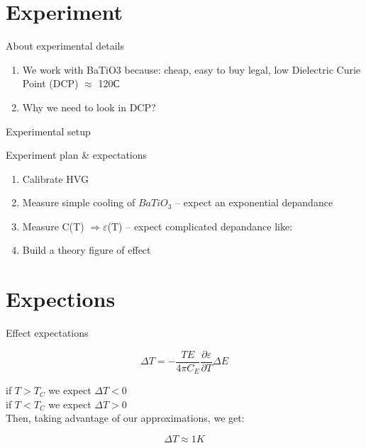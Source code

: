\documentclass [xcolor=svgnames, t] {beamer}
\begin{document}
\section{Experiment}
\begin{frame}{About experimental details}
    \begin{enumerate}
        \item We work with BaTiO3 because: cheap, easy to buy legal, low Dielectric Curie Point (DCP) \(\approx\) 120С
\item Why we need to look in DCP? 
    \end{enumerate}
\end{frame}
\begin{frame}{Experimental setup
}
\end{frame}
\begin{frame}{}
\end{frame}

\begin{frame}{Experiment plan \& expectations
}
\vspace{1,2 cm}
   \begin{enumerate}
       \item Calibrate HVG
\item Measure simple cooling of \(BaTiO_{3}\) – expect an exponential depandance
\item Measure C(T) \(\Rightarrow \varepsilon\)(T) – expect complicated depandance like:
\item Build a theory figure of effect
   \end{enumerate} 
\end{frame}

\begin{frame}{}
\end{frame}

\section{Expections}
\begin{frame}{Effect expectations}
\begin{block}
    
\begin{equation}
    \Delta T = -\frac{TE}{4\pi C_E} \frac{\partial \varepsilon}{\partial T} \Delta E
\end{equation}
\end{block}
\vspace{0.3 cm}
if $T > T_C $ we expect $\Delta T < 0$\\
if $T < T_C $ we expect $\Delta T > 0$\\
\vspace{0.3 cm}
Then, taking advantage of our approximations, we get:
\begin{block}{}
\begin{equation}
    \Delta T \approx 1 K
\end{equation}
\end{block}
\end{frame}
\end{document}
